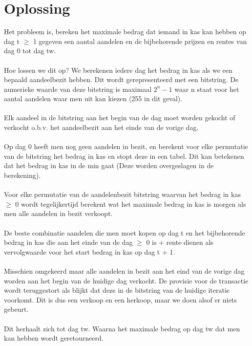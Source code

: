 \documentclass{article}
\begin{document}
\section{Oplossing}
Het probleem is, bereken het maximale bedrag dat iemand in kas kan hebben op dag t $\ge$ 1 gegeven een aantal aandelen en de bijbehorende prijzen en rentes van dag 0 tot dag tw. \\\\
Hoe lossen we dit op? We berekenen iedere dag het bedrag in kas als we een bepaald aandeelbezit hebben. Dit wordt gerepresenteerd met een bitstring. De numerieke waarde van deze bitstring is maximaal $2^n - 1$ waar n staat voor het aantal aandelen waar men uit kan kiezen (255 in dit geval). \\\\Elk aandeel in de bitstring aan het begin van de dag moet worden gekocht of verkocht o.b.v. het aandeelbezit aan het einde van de vorige dag.\\\\ Op dag 0 heeft men nog geen aandelen in bezit, en berekent voor elke permutatie van de bitstring het bedrag in kas en stopt deze in een tabel. Dit kan betekenen dat het bedrag in kas in de min gaat (Deze worden overgeslagen in de berekening).
\\\\
Voor elke permutatie van de aandelenbezit bitstring waarvan het bedrag in kas $\ge$ 0 wordt tegelijkertijd berekent wat het maximale bedrag in kas is morgen als men alle aandelen in bezit verkoopt.\\\\
De beste combinatie aandelen die men moet kopen op dag t en het bijbehorende bedrag in kas die aan het einde van de dag $\ge$ 0 is + rente dienen als vervolgwaarde voor het start bedrag in kas op dag t + 1.\\\\ Misschien omgekeerd maar alle aandelen in bezit aan het eind van de vorige dag worden aan het begin van de huidige dag verkocht. De provisie voor de transactie wordt teruggestort als blijkt dat deze in de bitstring van de huidige iteratie voorkomt. Dit is dus een verkoop en een herkoop, maar we doen alsof er niets gebeurt.\\\\
Dit herhaalt zich tot dag tw. Waarna het maximale bedrag op dag tw dat men kan hebben wordt geretourneerd.\\
\end{document}
